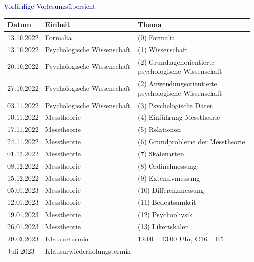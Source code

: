 \documentclass[
  8pt,
  ignorenonframetext,
]{beamer}
\begin{document}
\begin{frame}{}
\protect\hypertarget{section-1}{}
\vspace{1mm}

\textcolor{darkblue}{Vorläufige Vorlesungsübersicht}

\small
\center
\footnotesize
\renewcommand{\arraystretch}{1.1}
\begin{tabular}{lll}
Datum        & Einheit                       & Thema                                                           \\\hline
13.10.2022   & Formalia                      & (0) Formalia                                            \\
13.10.2022   & Psychologische Wissenschaft   & (1) Wissenschaft                                        \\
20.10.2022   & Psychologische Wissenschaft   & (2) Grundlagenorientierte psychologische Wissenschaft   \\
27.10.2022   & Psychologische Wissenschaft   & (2) Anwendungsorientierte psychologische Wissenschaft   \\
03.11.2022   & Psychologische Wissenschaft   & (3) Psychologische Daten                                \\
10.11.2022   & Messtheorie                   & (4) Einführung Messtheorie                              \\
17.11.2022   & Messtheorie                   & (5) Relationen                                          \\
24.11.2022   & Messtheorie                   & (6) Grundprobleme der Messtheorie                       \\
01.12.2022   & Messtheorie                   & (7) Skalenarten                                         \\
08.12.2022   & Messtheorie                   & (8) Ordinalmessung                                      \\
15.12.2022   & Messtheorie                   & (9) Extensivmessung                                     \\
05.01.2023   & Messtheorie                   & (10) Differenzmessung                                   \\
12.01.2023   & Messtheorie                   & (11) Bedeutsamkeit                                      \\
19.01.2023   & Messtheorie                   & (12) Psychophysik                                       \\
26.01.2023   & Messtheorie                   & (13) Likertskalen                                        \\\hline
29.03.2023   & Klausurtermin                 & 12:00 – 13:00 Uhr, G16 – H5                             \\
Juli 2023    & Klausurwiederholungstermin    &
\end{tabular}
\end{frame}
\end{document}
